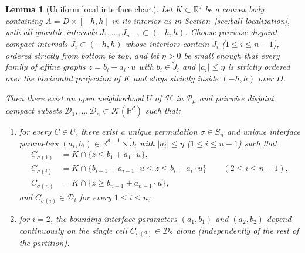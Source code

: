 \documentclass[11pt,a4paper]{amsart}
\numberwithin{equation}{section}
\newtheorem{lemma}[theorem]{Lemma}
\theoremstyle{definition}
\newcommand{\R}{\mathbb{R}}
\newcommand{\Kcal}{\mathcal{K}}
\newcommand{\Pcal}{\mathcal{P}}
\newcommand{\Hcal}{\mathcal{H}}
\newcommand{\Dcal}{\mathcal{D}}
\begin{document}
\begin{lemma}[Uniform local interface chart]
\label{lem:local-chart}
Let $K \subset \R^d$ be a convex body containing $A = D \times [-h, h]$ in its interior as in Section~\ref{sec:ball-localization}, with all quantile intervals $J_1, \dots, J_{n-1} \subset (-h, h)$. Choose pairwise disjoint compact intervals $\widetilde J_i \subset (-h, h)$ whose interiors contain $J_i$ ($1 \le i \le n-1$), ordered strictly from bottom to top, and let $\eta > 0$ be small enough that every family of affine graphs $z = b_i + a_i \cdot u$ with $b_i \in \widetilde J_i$ and $|a_i| \le \eta$ is strictly ordered over the horizontal projection of $K$ and stays strictly inside $(-h, h)$ over $D$.

Then there exist an open neighborhood $U$ of $\Hcal$ in $\Pcal_\mu$ and pairwise disjoint compact subsets $\Dcal_1, \dots, \Dcal_n \subset \Kcal(\R^d)$ such that:
\begin{enumerate}[label=\textup{(\alph*)}]
\item for every $C \in U$, there exist a unique permutation $\sigma \in S_n$ and unique interface parameters $(a_i, b_i) \in \R^{d-1} \times \widetilde J_i$ with $|a_i| \le \eta$ ($1 \le i \le n-1$) such that
\begin{align*}
C_{\sigma(1)} &= K \cap \{z \le b_1 + a_1 \cdot u\}, \\
C_{\sigma(i)} &= K \cap \{b_{i-1} + a_{i-1} \cdot u \le z \le b_i + a_i \cdot u\} \qquad (2 \le i \le n-1), \\
C_{\sigma(n)} &= K \cap \{z \ge b_{n-1} + a_{n-1} \cdot u\},
\end{align*}
and $C_{\sigma(i)} \in \Dcal_i$ for every $1 \le i \le n$;
\item for $i = 2$, the bounding interface parameters $(a_1, b_1)$ and $(a_2, b_2)$ depend continuously on the single cell $C_{\sigma(2)} \in \Dcal_2$ alone (independently of the rest of the partition).
\end{enumerate}
\end{lemma}
\end{document}
